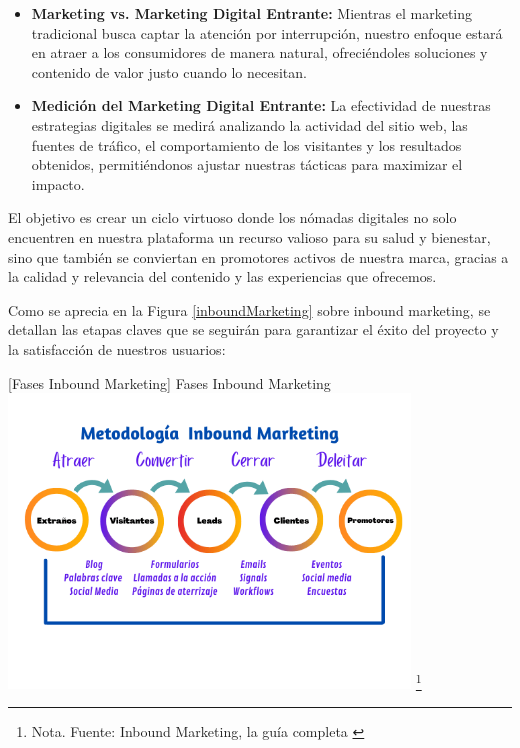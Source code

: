 {\begin{itemize}
    \item \textbf{Marketing vs. Marketing Digital Entrante:} Mientras el marketing tradicional busca captar la atención por interrupción, nuestro enfoque estará en atraer a los consumidores de manera natural, ofreciéndoles soluciones y contenido de valor justo cuando lo necesitan.
    
    \item \textbf{Medición del Marketing Digital Entrante:} La efectividad de nuestras estrategias digitales se medirá analizando la actividad del sitio web, las fuentes de tráfico, el comportamiento de los visitantes y los resultados obtenidos, permitiéndonos ajustar nuestras tácticas para maximizar el impacto.
\end{itemize}

El objetivo es crear un ciclo virtuoso donde los nómadas digitales no solo encuentren en nuestra plataforma un recurso valioso para su salud y bienestar, sino que también se conviertan en promotores activos de nuestra marca, gracias a la calidad y relevancia del contenido y las experiencias que ofrecemos.

Como se aprecia en la Figura \ref{inboundMarketing} sobre inbound marketing, se detallan las etapas claves que se seguirán para garantizar el éxito del proyecto y la satisfacción de nuestros usuarios:

\vspace{2mm}
        \begin{minipage}{0.9\textwidth}
        \centering
        [{Fases Inbound Marketing}]{ Fases Inbound Marketing  }
        \label{inboundMarketing}
         \includegraphics[width=0.8\textwidth]{Content/Images/Metodologia-Inbound-Marketing.png}
        \footnote{Nota. \textup{Fuente: Inbound Marketing, la guía completa \cite{EstudioTurismoenterritoriosruralesdeBogotá}}}  
\end{minipage}


}
